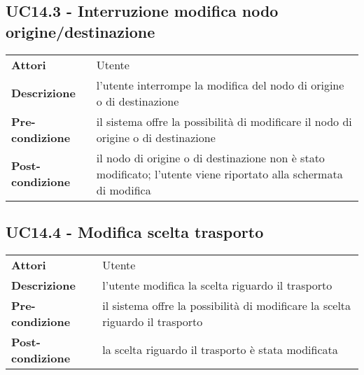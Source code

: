 \subsection{UC14.3 - Interruzione modifica nodo origine/destinazione}
\label{sssec:UC14.3}
\def\arraystretch{1.5}
\begin{tabularx}{\textwidth}{l|p{}}
\rowcolor{I} \multicolumn{2}{c}{\color{white}\textbf{UC14.3 - Interruzione modifica nodo origine/destinazione}} \\
\toprule
\endhead
\textbf{Attori} & Utente\\
\textbf{Descrizione} & l'utente interrompe la modifica del nodo di origine o di destinazione\\
\textbf{Pre-condizione} & il sistema offre la possibilità di modificare il nodo di origine o di destinazione\\
\textbf{Post-condizione} & il nodo di origine o di destinazione non è stato modificato; l'utente viene riportato alla schermata di modifica\\
\bottomrule
\end{tabularx}
\subsection{UC14.4 - Modifica scelta trasporto}
\label{sssec:UC14.4}
\def\arraystretch{1.5}
\begin{tabularx}{\textwidth}{l|p{}}
\rowcolor{I} \multicolumn{2}{c}{\color{white}\textbf{UC14.4 - Modifica scelta trasporto}} \\
\toprule
\endhead
\textbf{Attori} & Utente\\
\textbf{Descrizione} & l'utente modifica la scelta riguardo il trasporto\\
\textbf{Pre-condizione} & il sistema offre la possibilità di modificare la scelta riguardo il trasporto\\
\textbf{Post-condizione} & la scelta riguardo il trasporto è stata modificata\\
\bottomrule
\end{tabularx}
